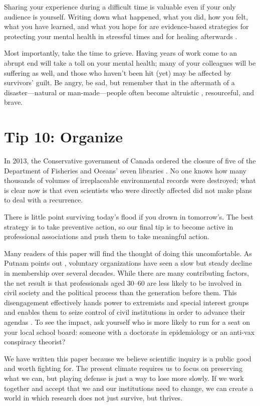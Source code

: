 \documentclass[10pt,letterpaper]{article}
\begin{document}
Sharing your experience during a difficult time is valuable even if your only audience is yourself.
Writing down what happened, what you did, how you felt, what you have learned, and what you hope for
are evidence-based strategies for protecting your mental health in stressful times
and for healing afterwards \cite{Pennebaker2016,Cullen2022}.

Most importantly,
take the time to grieve.
Having years of work come to an abrupt end will take a toll on your mental health;
many of your colleagues will be suffering as well,
and those who haven't been hit (yet) may be affected by survivors' guilt.
Be angry,
be sad,
but remember that in the aftermath of a disaster---natural or man-made---people
often become altruistic \cite{Yang2024}, resourceful, and brave.

\section*{Tip 10: Organize}

In 2013,
the Conservative government of Canada ordered the closure of
five of the Department of Fisheries and Oceans' seven libraries \cite{Nikiforuk2013}.
No one knows how many thousands of volumes of irreplaceable environmental records were destroyed;
what is clear now is that even scientists who were directly affected
did not make plans to deal with a recurrence.

There is little point surviving today's flood if you drown in tomorrow's.
The best strategy is to take preventive action,
so our final tip is to become active in professional associations
and push them to take meaningful action.

Many readers of this paper will find the thought of doing this uncomfortable.
As Putnam points out \cite{Putnam2020},
voluntary organizations have seen a slow but steady decline in membership over several decades.
While there are many contributing factors,
the net result is that professionals aged 30--60
are less likely to be involved in civil society and the political process than the generation before them.
This disengagement effectively hands power to extremists and special interest groups
and enables them to seize control of civil institutions in order to advance their agendas \cite{BuenoDeMesquita2022}.
To see the impact,
ask yourself who is more likely to run for a seat on your local school board:
someone with a doctorate in epidemiology or an anti-vax conspiracy theorist?

We have written this paper because we believe scientific inquiry is a public good and worth fighting for.
The present climate requires us to focus on preserving what we can,
but playing defense is just a way to lose more slowly.
If we work together and accept that we and our institutions need to change,
we can create a world in which research does not just survive,
but thrives.


\end{document}
